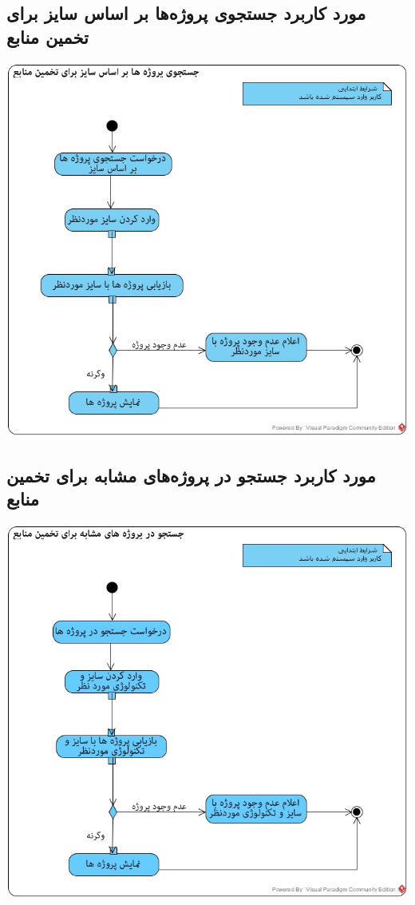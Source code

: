 \documentclass{article}
\begin{document}
\subsection*{مورد کاربرد جستجوی پروژه‌ها بر اساس سایز برای تخمین منابع}
\vspace{2cm}
\begin{center}
\includegraphics[width=\textwidth]{ActivityDiagrams/44.jpg}
\end{center}

\newpage
\vspace{2cm}
\subsection*{مورد کاربرد جستجو در پروژه‌های مشابه برای تخمین منابع}
\vspace{2cm}
\begin{center}
\includegraphics[width=\textwidth]{ActivityDiagrams/45.jpg}
\end{center}
\end{document}
